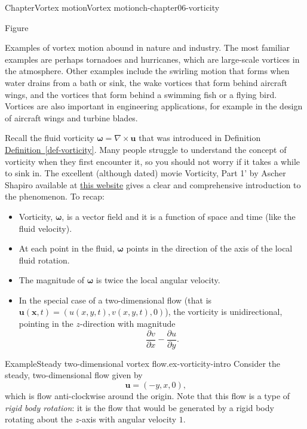 \documentclass[oneside,10pt,]{book}
\newcommand{\xreffont}{\relax}
\numberwithin{equation}{section}
\newcommand{\pd}[2]{\frac{\partial#1}{\partial#2}}
\newcommand{\bx}{\boldsymbol{x}}
\newcommand{\bu}{\boldsymbol{u}}
\newcommand{\bomega}{\boldsymbol{\omega}}
\begin{document}
\begin{chapterptx}{Chapter}{Vortex motion}{}{Vortex motion}{}{}{ch-chapter06-vorticity}
\begin{introduction}{}
\begin{sidebyside}{3}{0}{0}{0}
\begin{sbspanel}{0.333333333333333}
\begin{panelfigureptx}{Figure}
\tcblower
\end{panelfigureptx}%
\end{sbspanel}%
\end{sidebyside}%
\par
Examples of vortex motion abound in nature and industry. The most familiar examples are perhaps tornadoes and hurricanes, which are large-scale vortices in the atmosphere. Other examples include the swirling motion that forms when water drains from a bath or sink, the wake vortices that form behind aircraft wings, and the vortices that form behind a swimming fish or a flying bird. Vortices are also important in engineering applications, for example in the design of aircraft wings and turbine blades.%
\par
Recall the fluid vorticity \(\bomega=\nabla\times\bu\) that was introduced in Definition \hyperref[def-vorticity]{Definition~{\xreffont\ref{def-vorticity}}}. Many people struggle to understand the concept of vorticity when they first encounter it, so you should not worry if it takes a while to sink in. The excellent (although dated) movie \textasciigrave{}Vorticity, Part 1’ by Ascher Shapiro available at \href{https://web.mit.edu/hml/ncfmf.html}{this website} gives a clear and comprehensive introduction to the phenomenon. To recap:%
\begin{itemize}[label=\textbullet]
\item{}Vorticity, \(\bomega\), is a vector field and it is a function of space and time (like the fluid velocity).%
\item{}At each point in the fluid, \(\bomega\) points in the direction of the axis of the local fluid rotation.%
\item{}The magnitude of \(\bomega\) is twice the local angular velocity.%
\item{}In the special case of a two-dimensional flow (that is \(\bu(\bx,t)=(u(x,y,t),v(x,y,t),0)\)), the vorticity is unidirectional, pointing in the \(z\)-direction with magnitude%
\begin{equation*}
\pd{v}{x}-\pd{u}{y}\text{.}
\end{equation*}
%
\end{itemize}
%
\begin{example}{Example}{Steady two-dimensional vortex flow.}{ex-vorticity-intro}%
Consider the steady, two-dimensional flow given by%
\begin{equation*}
\bu = (-y,x, 0)\text{,}
\end{equation*}
which is flow anti-clockwise around the origin. Note that this flow is a type of \emph{rigid body rotation}: it is the flow that would be generated by a rigid body rotating about the \(z\)-axis with angular velocity \(1\).%

\end{example}
\end{introduction}
\end{chapterptx}
\end{document}
